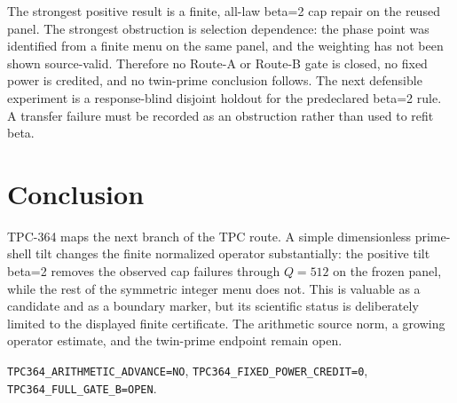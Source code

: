 \documentclass[10pt]{article}
\begin{document}
The strongest positive result is a finite, all-law beta=2 cap repair on the
reused panel.  The strongest obstruction is selection dependence: the phase
point was identified from a finite menu on the same panel, and the weighting
has not been shown source-valid.  Therefore no Route-A or Route-B gate is
closed, no fixed power is credited, and no twin-prime conclusion follows.
The next defensible experiment is a response-blind disjoint holdout for the
predeclared beta=2 rule.  A transfer failure must be recorded as an
obstruction rather than used to refit beta.

\section{Conclusion}

TPC-364 maps the next branch of the TPC route.  A simple dimensionless
prime-shell tilt changes the finite normalized operator substantially: the
positive tilt beta=2 removes the observed cap failures through $Q=512$ on the
frozen panel, while the rest of the symmetric integer menu does not.  This is
valuable as a candidate and as a boundary marker, but its scientific status
is deliberately limited to the displayed finite certificate.  The arithmetic
source norm, a growing operator estimate, and the twin-prime endpoint remain
open.

\begin{center}\small
\texttt{TPC364\_ARITHMETIC\_ADVANCE=NO},\quad
\texttt{TPC364\_FIXED\_POWER\_CREDIT=0},\quad
\texttt{TPC364\_FULL\_GATE\_B=OPEN}.
\end{center}
\end{document}
